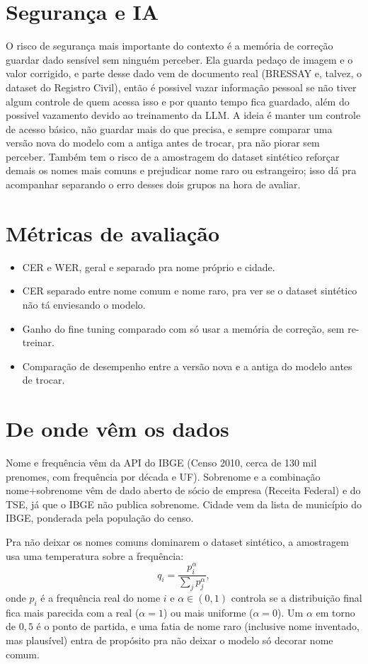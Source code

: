 \documentclass[10pt,a4paper]{article}
\begin{document}
\section{Segurança e IA}
O risco de segurança mais importante do contexto é a memória de correção guardar dado sensível sem ninguém perceber. Ela guarda pedaço de imagem e o valor corrigido, e parte desse dado vem de documento real (BRESSAY e, talvez, o dataset do Registro Civil), então é possivel vazar informação pessoal se não tiver algum controle de quem acessa isso e por quanto tempo fica guardado, além do possivel vazamento devido ao treinamento da LLM. A ideia é manter um controle de acesso básico, não guardar mais do que precisa, e sempre comparar uma versão nova do modelo com a antiga antes de trocar, pra não piorar sem perceber. Também tem o risco de a amostragem do dataset sintético reforçar demais os nomes mais comuns e prejudicar nome raro ou estrangeiro; isso dá pra acompanhar separando o erro desses dois grupos na hora de avaliar.

\section{Métricas de avaliação}
\begin{itemize}
\item CER e WER, geral e separado pra nome próprio e cidade.
\item CER separado entre nome comum e nome raro, pra ver se o dataset sintético não tá enviesando o modelo.
\item Ganho do fine tuning comparado com só usar a memória de correção, sem re-treinar.
\item Comparação de desempenho entre a versão nova e a antiga do modelo antes de trocar.
\end{itemize}

\section{De onde vêm os dados}
Nome e frequência vêm da API do IBGE (Censo 2010, cerca de 130 mil prenomes, com frequência por década e UF). Sobrenome e a combinação nome+sobrenome vêm de dado aberto de sócio de empresa (Receita Federal) e do TSE, já que o IBGE não publica sobrenome. Cidade vem da lista de município do IBGE, ponderada pela população do censo.

Pra não deixar os nomes comuns dominarem o dataset sintético, a amostragem usa uma temperatura sobre a frequência:
\[
q_i = \frac{p_i^{\alpha}}{\sum_j p_j^{\alpha}},
\]
onde $p_i$ é a frequência real do nome $i$ e $\alpha \in (0,1)$ controla se a distribuição final fica mais parecida com a real ($\alpha=1$) ou mais uniforme ($\alpha=0$). Um $\alpha$ em torno de $0{,}5$ é o ponto de partida, e uma fatia de nome raro (inclusive nome inventado, mas plausível) entra de propósito pra não deixar o modelo só decorar nome comum.
\end{document}
